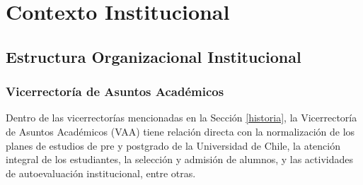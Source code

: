 
\section{Contexto Institucional}
\label{contexto_institucional}

\subsection{Estructura Organizacional Institucional}

\subsubsection{Vicerrectoría de Asuntos Académicos}

Dentro de las vicerrectorías mencionadas en la Sección \ref{historia}, la Vicerrectoría de Asuntos
Académicos (VAA) tiene relación directa con la normalización de los planes de estudios de pre y
postgrado de la Universidad de Chile, la atención integral de los estudiantes, la selección y admisión
de alumnos, y las actividades de autoevaluación institucional, entre otras.

